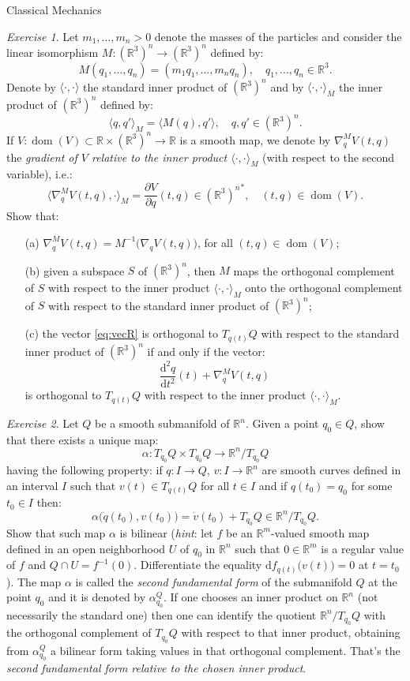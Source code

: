 \documentclass[oneside,a4paper,11pt]{amsbook}
\newcommand{\R}{\mathds R}
\newcommand{\dd}{\mathrm d}
\DeclareMathOperator{\Dom}{dom}
\theoremstyle{remark}\newtheorem{exercise}{Exercise}[chapter]
\theoremstyle{plain}\newtheorem{teo}{Theorem}[section]
\theoremstyle{plain}\newtheorem{lem}[teo]{Lemma}
\theoremstyle{plain}\newtheorem{prop}[teo]{Proposition}
\theoremstyle{plain}\newtheorem{cor}[teo]{Corollary}
\theoremstyle{definition}\newtheorem{defin}[teo]{Definition}
\theoremstyle{remark}\newtheorem{rem}[teo]{Remark}
\theoremstyle{definition}\newtheorem{notation}[teo]{Notation}
\theoremstyle{definition}\newtheorem{convention}[teo]{Convention}
\theoremstyle{definition}\newtheorem{example}[teo]{Example}
\numberwithin{section}{chapter}
\numberwithin{equation}{section}
\begin{document}
\begin{chapter}{Classical Mechanics}
\begin{exercise}\label{exe:massinnprod}
Let $m_1,\ldots,m_n>0$ denote the masses of the particles and consider the linear isomorphism $M:(\R^3)^n\to(\R^3)^n$
defined by:
\[M(q_1,\ldots,q_n)=(m_1q_1,\ldots,m_nq_n),\quad q_1,\ldots,q_n\in\R^3.\]
Denote by $\langle\cdot,\cdot\rangle$ the standard inner product of $(\R^3)^n$ and by $\langle\cdot,\cdot\rangle_M$
the inner product of $(\R^3)^n$ defined by:
\[\langle q,q'\rangle_M=\langle M(q),q'\rangle,\quad q,q'\in(\R^3)^n.\]
If $V:\Dom(V)\subset\R\times(\R^3)^n\to\R$ is a smooth map,
we denote by $\nabla^M_qV(t,q)$ the {\em gradient of $V$ relative to the inner product $\langle\cdot,\cdot\rangle_M$\/}
(with respect to the second variable), i.e.:
\[\langle\nabla^M_qV(t,q),\cdot\rangle_M=\frac{\partial V}{\partial q}(t,q)\in{(\R^3)^n}^*,\quad (t,q)\in\Dom(V).\]
Show that:
\begin{itemize}
\item[(a)] $\nabla^M_qV(t,q)=M^{-1}\big(\nabla_qV(t,q)\big)$, for all $(t,q)\in\Dom(V)$;
\item[(b)] given a subspace $S$ of $(\R^3)^n$, then $M$ maps the orthogonal complement of $S$ with respect
to the inner product $\langle\cdot,\cdot\rangle_M$ onto the orthogonal complement of $S$ with respect to the
standard inner product of $(\R^3)^n$;
\item[(c)] the vector \eqref{eq:vecR} is orthogonal to $T_{q(t)}Q$ with respect to the standard inner
product of $(\R^3)^n$ if and only if the vector:
\[\frac{\dd^2q}{\dd t^2}(t)+\nabla^M_qV(t,q)\]
is orthogonal to $T_{q(t)}Q$ with respect to the inner product $\langle\cdot,\cdot\rangle_M$.
\end{itemize}
\end{exercise}

\begin{exercise}\label{exe:secfundform}
Let $Q$ be a smooth submanifold of $\R^n$. Given a point $q_0\in Q$, show that there exists a unique map:
\[\alpha:T_{q_0}Q\times T_{q_0}Q\longrightarrow\R^n/T_{q_0}Q\]
having the following property: if $q:I\to Q$, $v:I\to\R^n$
are smooth curves defined in an interval $I$ such that $v(t)\in T_{q(t)}Q$ for all $t\in I$ and if $q(t_0)=q_0$
for some $t_0\in I$ then:
\[\alpha\big(\dot q(t_0),v(t_0)\big)=\dot v(t_0)+T_{q_0}Q\in\R^n/T_{q_0}Q.\]
Show that such map $\alpha$ is bilinear ({\em hint}: let $f$ be an $\R^m$-valued smooth map defined in an open
neighborhood $U$ of $q_0$ in $\R^n$ such that $0\in\R^m$ is a regular value of $f$ and $Q\cap U=f^{-1}(0)$.
Differentiate the equality $\dd f_{q(t)}\big(v(t)\big)=0$ at $t=t_0$). The map $\alpha$ is called the
{\em second fundamental form\/} of the submanifold $Q$ at the point $q_0$ and it is denoted by
$\alpha^Q_{q_0}$. If one chooses an inner product on $\R^n$ (not necessarily the standard one) then
one can identify the quotient $\R^n/T_{q_0}Q$ with the orthogonal complement of $T_{q_0}Q$ with respect
to that inner product, obtaining from $\alpha^Q_{q_0}$ a bilinear form taking values in that orthogonal
complement. That's the {\em second fundamental form relative to the chosen inner product}.
\end{exercise}


\end{chapter}
\end{document}
